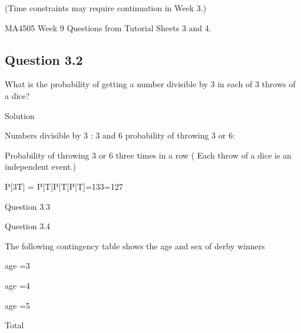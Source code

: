 \documentclass[]{report}
\begin{document}
(Time constraints may require continuation in Week 3.)

MA4505 Week 9   Questions from Tutorial Sheets 3 and 4.











\subsection{Question 3.2 }


What is the probability of getting a number divisible by 3 in each of 3 throws of a dice?




Solution



Numbers divisible by 3 : 3 and 6            probability of throwing 3 or 6:   



Probability of throwing 3 or 6 three times in a row  ( Each throw of a dice is an independent event.)



P[3T] = P[T]P[T]P[T]=133=127






Question 3.3 






Question 3.4 


The following contingency table shows the age and sex of derby winners















age =3


age =4 


age =5


Total
\end{document}
